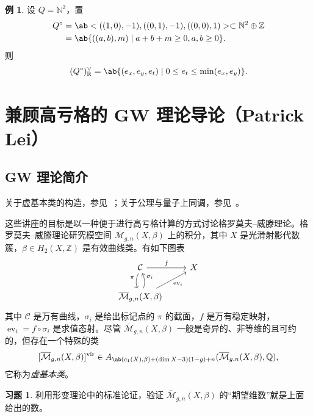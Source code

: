 \documentclass{amsart}
\theoremstyle{definition}
\newtheorem{exm}[thm]{例}
\newtheorem{exer}[thm]{习题}
\theoremstyle{remark}
\theoremstyle{plain}
\theoremstyle{definition}
\theoremstyle{remark}
\newcommand{\N}{\mathbb{N}}
\newcommand{\R}{\mathbb{R}}
\newcommand{\Z}{\mathbb{Z}}
\newcommand{\Q}{\mathbb{Q}}
\newcommand{\Mbar}{\overline{\mathcal{M}}}
\newcommand{\mc}[1]{\mathcal{#1}}
\newcommand{\mr}[1]{\mathrm{#1}}
\newcommand{\on}[1]{\operatorname{#1}}
\newcommand{\1}{\mathbf{1}}
\newcommand{\2}{\mathbf{2}}
\newcommand{\3}{\mathbf{3}}
\newcommand{\vir}{\mr{vir}}
\DeclareMathOperator{\ev}{ev}
\begin{document}
\begin{exm}
    设 \(Q = \N^2\)，置
    \begin{align*}
        Q^{\circ} &= \ab<((1,0), -1), ((0,1), -1), ((0,0),1)> \subset \N^2 \oplus \Z \\
        &= \ab\{((a,b), m) \mid a+b+m \geq 0, a,b \geq 0 \}.
    \end{align*}
    则
    \[ (Q^{\circ})_{\R}^{\vee} = \ab\{ (e_x, e_y, e_t) \mid 0 \leq e_t \leq \min(e_x, e_y) \}. \]
\end{exm}






\section{兼顾高亏格的 GW 理论导论（Patrick Lei）}%
\label{sec:Intro to GW theory with a view to higher genus (Patrick Lei)}


\subsection{GW 理论简介}%
\label{sub:Introduction to GW theory}

关于虚基本类的构造，参见~\cite{BehrendFantechi1997}；关于公理与量子上同调，参见~\cite{KM1994}。

这些讲座的目标是以一种便于进行高亏格计算的方式讨论格罗莫夫–威滕理论。格罗莫夫–威滕理论研究模空间 \(\Mbar_{g,n}(X, \beta)\) 上的积分，其中 \(X\) 是光滑射影代数簇，\(\beta \in H_2(X, \Z)\) 是有效曲线类。有如下图表
\begin{equation*}
\begin{tikzcd}
    \mc{C} \ar{r}{f} \ar[bend right=20]{d}[swap]{\pi} & X \\
    \Mbar_{g,n}(X, \beta) \ar[bend right=20]{u}[swap]{\sigma_i} \ar{ur}[swap]{\on{ev}_i}
\end{tikzcd}
\end{equation*}
其中 \(\mc{C}\) 是万有曲线，\(\sigma_i\) 是给出标记点的 \(\pi\) 的截面，\(f\) 是万有稳定映射，\(\ev_i = f \circ \sigma_i\) 是求值态射。尽管 \(\Mbar_{g,n}(X, \beta)\) 一般是奇异的、非等维的且可约的，但存在一个特殊的类
\[ [\Mbar_{g,n}(X, \beta)]^{\vir} \in A_{\ab(c_1(X), \beta) + (\dim X - 3)(1-g) + n}(\Mbar_{g,n}(X, \beta), \Q), \]
它称为\textit{虚基本类}。

\begin{exer}
    利用形变理论中的标准论证，验证 \(\Mbar_{g,n}(X, \beta)\) 的“期望维数”就是上面给出的数。
\end{exer}
\end{document}
